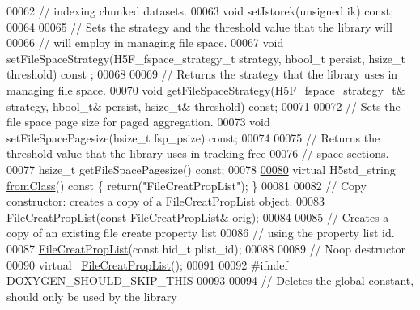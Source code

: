 \begin{DoxyCode}
00062         \textcolor{comment}{// indexing chunked datasets.}
00063         \textcolor{keywordtype}{void} setIstorek(\textcolor{keywordtype}{unsigned} ik) \textcolor{keyword}{const};
00064 
00065         \textcolor{comment}{// Sets the strategy and the threshold value that the library will}
00066         \textcolor{comment}{// will employ in managing file space.}
00067         \textcolor{keywordtype}{void} setFileSpaceStrategy(H5F\_fspace\_strategy\_t strategy, hbool\_t persist, hsize\_t threshold) \textcolor{keyword}{const}
      ;
00068 
00069         \textcolor{comment}{// Returns the strategy that the library uses in managing file space.}
00070         \textcolor{keywordtype}{void} getFileSpaceStrategy(H5F\_fspace\_strategy\_t& strategy, hbool\_t& persist, hsize\_t& threshold) \textcolor{keyword}{
      const};
00071 
00072         \textcolor{comment}{// Sets the file space page size for paged aggregation.}
00073         \textcolor{keywordtype}{void} setFileSpacePagesize(hsize\_t fsp\_psize) \textcolor{keyword}{const};
00074 
00075         \textcolor{comment}{// Returns the threshold value that the library uses in tracking free}
00076         \textcolor{comment}{// space sections.}
00077         hsize\_t getFileSpacePagesize() \textcolor{keyword}{const};
00078 
\hyperlink{class_h5_1_1_file_creat_prop_list_a5ae21c5253e8405e8bf0e58ac203b41d}{00080}         \textcolor{keyword}{virtual} H5std\_string \hyperlink{class_h5_1_1_file_creat_prop_list_a5ae21c5253e8405e8bf0e58ac203b41d}{fromClass}()\textcolor{keyword}{ const }\{ \textcolor{keywordflow}{return}(\textcolor{stringliteral}{"FileCreatPropList"}); \}
00081 
00082         \textcolor{comment}{// Copy constructor: creates a copy of a FileCreatPropList object.}
00083         \hyperlink{class_h5_1_1_file_creat_prop_list}{FileCreatPropList}(\textcolor{keyword}{const} \hyperlink{class_h5_1_1_file_creat_prop_list}{FileCreatPropList}& orig);
00084 
00085         \textcolor{comment}{// Creates a copy of an existing file create property list}
00086         \textcolor{comment}{// using the property list id.}
00087         \hyperlink{class_h5_1_1_file_creat_prop_list}{FileCreatPropList}(\textcolor{keyword}{const} hid\_t plist\_id);
00088 
00089         \textcolor{comment}{// Noop destructor}
00090         \textcolor{keyword}{virtual} ~\hyperlink{class_h5_1_1_file_creat_prop_list}{FileCreatPropList}();
00091 
00092 \textcolor{preprocessor}{#ifndef DOXYGEN\_SHOULD\_SKIP\_THIS}
00093 
00094         \textcolor{comment}{// Deletes the global constant, should only be used by the library}

\end{DoxyCode}
